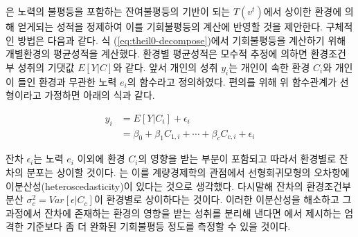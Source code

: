 \citet{betl12}은 노력의 불평등을 포함하는 잔여불평등의 기반이 되는 $T(v^t)$에서 상이한 환경에 의해 얻게되는 성적을 정제하여 이를 기회불평등의 계산에 반영할 것을 제안한다. 
구체적인 방법은 다음과 같다.
식 (\ref{eq:theil0-decompose})에서 기회불평등을 계산하기 위해 개별환경의 평균성적을 계산했다.
환경별 평균성적은 모수적 추정에 의하면 환경조건부 성취의 기댓값 $E[Y |C]$와 같다.
앞서 개인의 성취 $y_i$는 개인이 속한 환경 $C_i$와 개인이 들인 환경과 무관한 노력 $e_i$의 함수라고 정의하였다.
편의를 위해 위 함수관계가 선형이라고 가정하면 아래의 식과 같다.

\begin{equation}
\label{eq:ols}
\begin{aligned}
    y_{i} & = E[Y|C_i] + \epsilon _i \\
        &=\beta _0 +  \beta _1 C_{1,i} + \cdots + \beta _c C_{c,i} + \epsilon _i 
\end{aligned} 
\end{equation}

잔차 $\epsilon _i$는 노력 $e_i$ 이외에 환경 $C_i$의 영향을 받는 부분이 포함되고 따라서 환경별로 잔차의 분포는 상이할 것이다.
\citeauthor{betl12}는 이를 계량경제학의 관점에서 선형회귀모형의 오차항에 이분산성(heteroscedasticity)이 있다는 것으로 생각했다.
다시말해 잔차의 환경조건부 분산 $\sigma ^2 _c = Var[\epsilon |C_c]$이 환경별로 상이하다는 것이다.
이러한 이분산성을 해소하고 그 과정에서 잔차에 존재하는 환경의 영향을 받는 성취를 분리해 낸다면 \citet{fng11}에서 제시하는 엄격한 기준보다 좀 더 완화된 기회불평등 정도를 측정할 수 있을 것이다.

